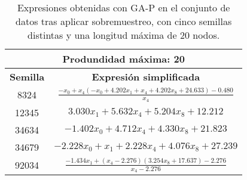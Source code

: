 \begin{table}[H]
\centering
\begin{tabular}{|c|c|}
\hline
\multicolumn{2}{|c|}{\textbf{Produndidad máxima: 20}}                                                                                                   \\ \hline
\textbf{Semilla} & \textbf{Expresión simplificada}                                                                                                      \\ \hline
8324             & $\frac{- x_{0} + x_{4} \left(- x_{0} + 4.202 x_{1} + x_{4} + 4.202 x_{8} + 24.633\right) - 0.480}{x_{4}}$          \\ \hline
12345            & $3.030 x_{1} + 5.632 x_{4} + 5.204 x_{8} + 12.212$                                                                 \\ \hline
34634            & $- 1.402 x_{0} + 4.712 x_{4} + 4.330 x_{8} + 21.823$                                         \\ \hline
34679            & $- 2.228 x_{0} + x_{1} + 2.228 x_{4} + 4.076 x_{8} + 27.239$                                       \\ \hline
92034            & $\frac{- 1.434 x_{1} + \left(x_{4} - 2.276\right) \left(3.254 x_{8} + 17.637\right) - 2.276}{x_{4} - 2.276}$ \\ \hline
\end{tabular}%
\caption{Expresiones obtenidas con GA-P en el conjunto de datos tras aplicar sobremuestreo, con cinco semillas distintas y una longitud máxima de 20 nodos.}\label{table:exp_GAP_over_c_20}
\end{table}



